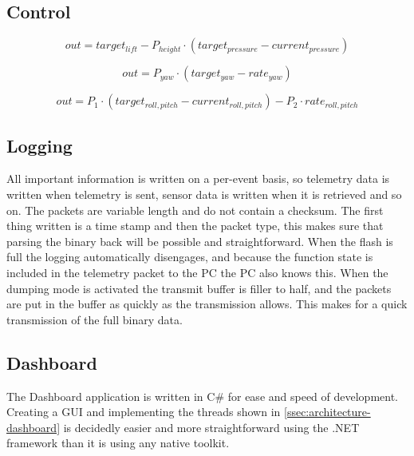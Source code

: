 \documentclass[final]{article}
\begin{document}
\subsection{Control}

\begin{equation}
out = target_{lift} - P_{height} \cdot (target_{pressure} - current_{pressure})
\label{eq:control-height}
\end{equation}

\begin{equation}
out = P_{yaw} \cdot (target_{yaw} - rate_{yaw})
\label{eq:control-yaw}
\end{equation}

\begin{equation}
out = P_1 \cdot (target_{roll,pitch} - current_{roll,pitch}) - P_2 \cdot rate_{roll,pitch}
\label{eq:control-roll-pitch}
\end{equation}


\subsection{Logging}
All important information is written on a per-event basis, so telemetry data is written when telemetry is sent, sensor data is written when it is retrieved and so on.
The packets are variable length and do not contain a checksum.
The first thing written is a time stamp and then the packet type, this makes sure that parsing the binary back will be possible and straightforward.
When the flash is full the logging automatically disengages, and because the function state is included in the telemetry packet to the PC the PC also knows this.
When the dumping mode is activated the transmit buffer is filler to half, and the packets are put in the buffer as quickly as the transmission allows.
This makes for a quick transmission of the full binary data.

\subsection{Dashboard}
The Dashboard application is written in C\# for ease and speed of development.
Creating a GUI and implementing the threads shown in \cref{ssec:architecture-dashboard} is decidedly easier and more straightforward using the .NET framework than it is using any native toolkit.
\end{document}
